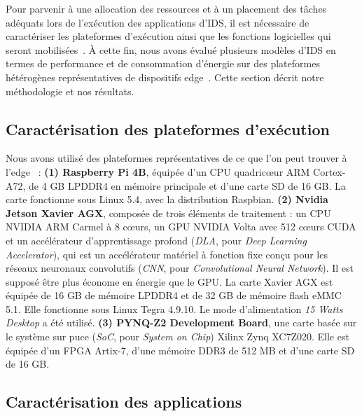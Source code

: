 Pour parvenir à une allocation des ressources et à un placement des tâches adéquats lors de l'exécution des applications d'IDS, il est nécessaire de caractériser les plateformes d'exécution ainsi que les fonctions logicielles qui seront mobilisées~\cite{mampageHolisticViewResource2022}. À cette fin, nous avons évalué plusieurs modèles d'IDS en termes de performance et de consommation d'énergie sur des plateformes hétérogènes représentatives de dispositifs edge~\cite{kljucaric2020}. Cette section décrit notre méthodologie et nos résultats.

\subsection{Caractérisation des plateformes d'exécution} \label{section:herocache-characterization-platforms}

Nous avons utilisé des plateformes représentatives de ce que l'on peut trouver à l'edge~\cite{slimani:hal-04159551,kljucaric2020} :
\textbf{(1) Raspberry Pi 4B}, équipée d'un CPU quadricœur ARM Cortex-A72, de 4 GB LPDDR4 en mémoire principale et d'une carte SD de 16 GB. La carte fonctionne sous Linux 5.4, avec la distribution Raspbian.
\textbf{(2) Nvidia Jetson Xavier AGX}, composée de trois éléments de traitement : un CPU NVIDIA ARM Carmel à 8 cœurs, un GPU NVIDIA Volta avec 512 cœurs CUDA et un accélérateur d'apprentissage profond (\textit{DLA}, pour \textit{Deep Learning Accelerator}), qui est un accélérateur matériel à fonction fixe conçu pour les réseaux neuronaux convolutifs (\textit{CNN}, pour \textit{Convolutional Neural Network}). Il est supposé être plus économe en énergie que le GPU. La carte Xavier AGX est équipée de 16 GB de mémoire LPDDR4 et de 32 GB de mémoire flash eMMC 5.1. Elle fonctionne sous Linux Tegra 4.9.10. Le mode d'alimentation \textit{15 Watts Desktop} a été utilisé.
\textbf{(3) PYNQ-Z2 Development Board}, une carte basée sur le système sur puce (\textit{SoC}, pour \textit{System on Chip}) Xilinx Zynq XC7Z020. Elle est équipée d'un FPGA Artix-7, d'une mémoire DDR3 de 512 MB et d'une carte SD de 16 GB.

\subsection{Caractérisation des applications}
\label{section:herocache-characterization-workloads}

